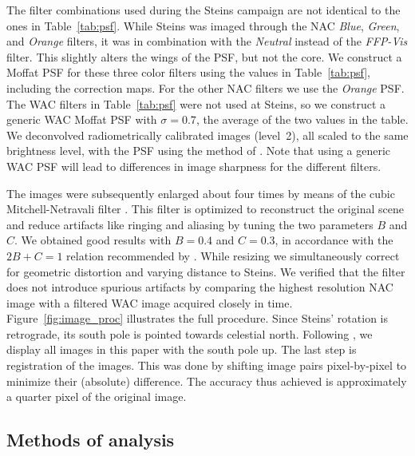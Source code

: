 \documentclass[preprint,3p,authoryear]{elsarticle}
\begin{document}
The filter combinations used during the Steins campaign are not identical to the ones in Table~\ref{tab:psf}. While Steins was imaged through the NAC {\it Blue}, {\it Green}, and {\it Orange} filters, it was in combination with the {\it Neutral} instead of the {\it FFP-Vis} filter. This slightly alters the wings of the PSF, but not the core. We construct a Moffat PSF for these three color filters using the values in Table~\ref{tab:psf}, including the correction maps. For the other NAC filters we use the {\it Orange} PSF. The WAC filters in Table~\ref{tab:psf} were not used at Steins, so we construct a generic WAC Moffat PSF with $\sigma = 0.7$, the average of the two values in the table. We deconvolved radiometrically calibrated images (level~2), all scaled to the same brightness level, with the PSF using the method of \citet{S08}. Note that using a generic WAC PSF will lead to differences in image sharpness for the different filters.

The images were subsequently enlarged about four times by means of the cubic Mitchell-Netravali filter \citep{MN88}. This filter is optimized to reconstruct the original scene and reduce artifacts like ringing and aliasing by tuning the two parameters $B$ and $C$. We obtained good results with $B = 0.4$ and $C = 0.3$, in accordance with the $2B + C = 1$ relation recommended by \citeauthor{MN88}. While resizing we simultaneously correct for geometric distortion and varying distance to Steins. We verified that the filter does not introduce spurious artifacts by comparing the highest resolution NAC image with a filtered WAC image acquired closely in time. Figure~\ref{fig:image_proc} illustrates the full procedure. Since Steins' rotation is retrograde, its south pole is pointed towards celestial north. Following \citet{K09}, we display all images in this paper with the south pole up. The last step is registration of the images. This was done by shifting image pairs pixel-by-pixel to minimize their (absolute) difference. The accuracy thus achieved is approximately a quarter pixel of the original image.

\subsection{Methods of analysis}
\end{document}
